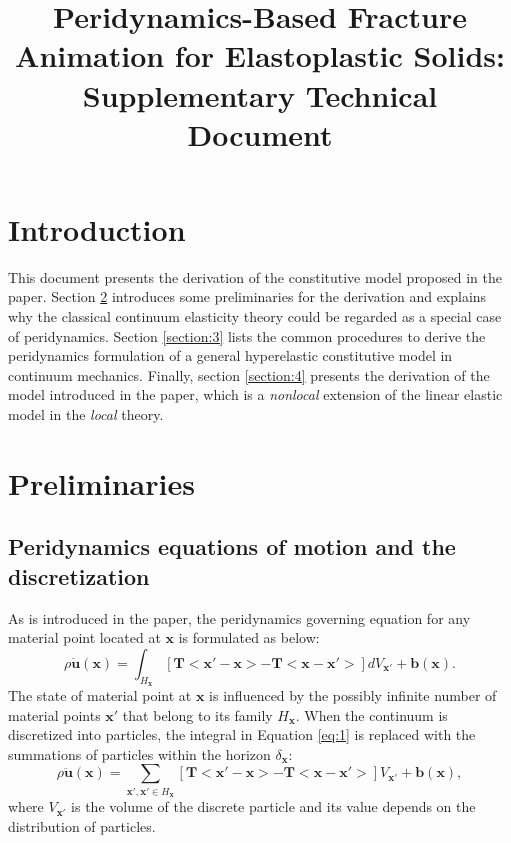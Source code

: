\documentclass[11pt,fullpage]{article}
\title{Peridynamics-Based Fracture Animation for Elastoplastic Solids:\\
      Supplementary Technical Document}
\newcommand{\mb}[1]{\mathbf{#1}}
\newcommand{\blue}[1]{#1}
\begin{document}
\maketitle

\section{Introduction}

This document presents the derivation of the constitutive model proposed in the paper. Section \blue{\ref{section:2}} introduces some preliminaries for the derivation and explains why the classical continuum elasticity theory could be regarded as a special case of peridynamics. Section \blue{\ref{section:3}} lists the common procedures to derive the peridynamics formulation of a general hyperelastic constitutive model in continuum mechanics. Finally, section \blue{\ref{section:4}} presents the derivation of the model introduced in the paper, which is a \emph{nonlocal} extension of the linear elastic model in the \emph{local} theory.

\section{Preliminaries}\label{section:2}

\subsection{Peridynamics equations of motion and the discretization}

As is introduced in the paper, the peridynamics governing equation for any material point located at $\mb{x}$ is formulated as below:
\begin{equation}
\rho\ddot{\mb{u}}(\mb{x}) = \int_{H_\mb{x}}[\mb{T}<\mb{x}'-\mb{x}> - \mb{T}<\mb{x}-\mb{x}'>]dV_{\mb{x}'}+\mb{b}(\mb{x}).
\label{eq:1}
\end{equation}
The state of material point at $\mb{x}$ is influenced by the possibly infinite number of material points $\mb{x}'$ that belong to its family $H_\mb{x}$. When the continuum is discretized into particles, the integral in Equation \blue{\ref{eq:1}} is replaced with the summations of particles within the horizon $\delta_\mb{x}$:
\begin{equation}
\rho\ddot{\mb{u}}(\mb{x}) = \sum_{\mb{x}',\mb{x}'\in H_\mb{x}}[\mb{T}<\mb{x}'-\mb{x}> - \mb{T}<\mb{x}-\mb{x}'>]V_{\mb{x}'}+\mb{b}(\mb{x}),
\label{eq:2}
\end{equation}
where $V_{\mb{x}'}$ is the volume of the discrete particle and its value depends on the distribution of particles.
\end{document}
